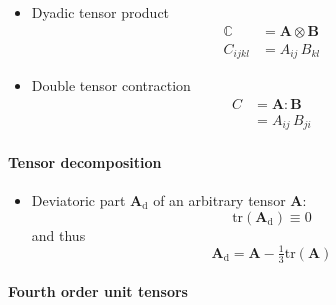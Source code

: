 \documentclass[namecite, fleqn]{goose-article}
\begin{document}
\begin{itemize}

    \item Dyadic tensor product
    \begin{align}
        \mathbb{C} &= \bm{A} \otimes \bm{B} \\
        C_{ijkl} &= A_{ij} \, B_{kl}
    \end{align}

    \item Double tensor contraction
    \begin{align}
        C &= \bm{A} : \bm{B} \\
        &= A_{ij} \, B_{ji}
    \end{align}

\end{itemize}

\paragraph{Tensor decomposition}
\vspace*{.5eM}

\begin{itemize}

    \item Deviatoric part $\bm{A}_\mathrm{d}$ of an arbitrary tensor $\bm{A}$:
    \begin{equation}
        \mathrm{tr}\left( \bm{A}_\mathrm{d} \right) \equiv 0
    \end{equation}
    and thus
    \begin{equation}
        \bm{A}_\mathrm{d} = \bm{A} - \tfrac{1}{3} \mathrm{tr}\left( \bm{A} \right)
    \end{equation}

\end{itemize}

\paragraph{Fourth order unit tensors}
\vspace*{.5eM}
\end{document}
